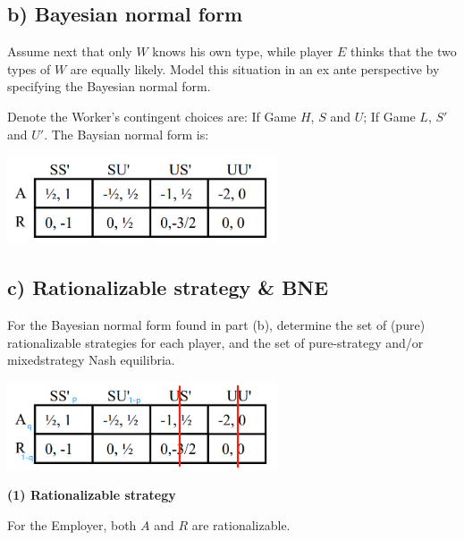 \documentclass{article}
\begin{document}
\subsection*{b) Bayesian normal form} Assume next that only $W$ knows his own type, while player $E$ thinks that the two types
of $W$ are equally likely. Model this situation in an ex ante perspective by specifying
the Bayesian normal form.

\bigskip

Denote the Worker's contingent choices are: If Game $H$, $S$ and $U$; If Game $L$, $S'$ and $U'$. The Baysian normal form is:


\begin{center}
\includegraphics[width=0.6\textwidth]{12.q2_2}
\vspace{2mm}
\end{center}


\subsection*{c) Rationalizable strategy \& BNE} For the Bayesian normal form found in part (b), determine the set of (pure)
rationalizable strategies for each player, and the set of pure-strategy and/or mixedstrategy Nash equilibria.

\bigskip

\begin{center}
\includegraphics[width=0.6\textwidth]{12.q2_3}
\vspace{2mm}
\end{center}


\textbf{(1) Rationalizable strategy}

\medskip

For the Employer, both $A$ and $R$ are rationalizable.

\medskip
\end{document}
